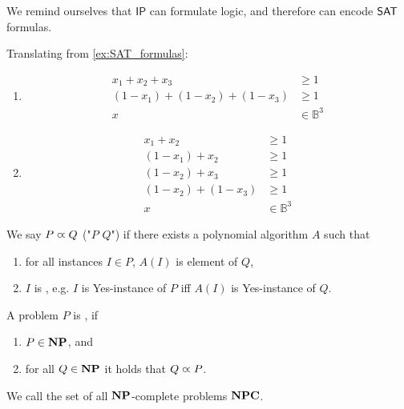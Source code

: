 
We remind ourselves that $\mathsf{IP}$ can formulate logic, and therefore can encode
$\mathsf{SAT}$ formulas.
\begin{example}
    Translating from \autoref{ex:SAT_formulas}:
    \begin{enumerate}
        \item
              \begin{align*}
                  x_1 + x_2 + x_3             & \geq 1           \\
                  (1-x_1) + (1-x_2) + (1-x_3) & \geq 1           \\
                  x                           & \in \mathbb{B}^3
              \end{align*}
        \item
              \begin{align*}
                  x_1 + x_2         & \geq 1           \\
                  (1-x_1) + x_2     & \geq 1           \\
                  (1-x_2) + x_3     & \geq 1           \\
                  (1-x_2) + (1-x_3) & \geq 1           \\
                  x                 & \in \mathbb{B}^3
              \end{align*}
    \end{enumerate}
\end{example}
\begin{definition}[Reduction]
    We say $P \varpropto Q$ ("$P$  $Q$") if there exists a polynomial algorithm $A$
    such that
    \begin{enumerate}
        \item for all instances $I \in P$, $A(I)$ is element of $Q$,
        \item $I$ is , e.g. $I$ is Yes-instance of $P$ iff $A(I)$ is Yes-instance of $Q$.
    \end{enumerate}
\end{definition}
\begin{definition}[$\NP$-complete]
    \label{def:NPC}
    A problem $P$ is , if
    \begin{enumerate}
        \item $P \in \mathbf{NP}$, and
        \item for all $Q \in \mathbf{NP}$ it holds that $Q \varpropto P$.
    \end{enumerate}
    We call the set of all $\NP$-complete problems $\mathbf{NPC}$.
\end{definition}
